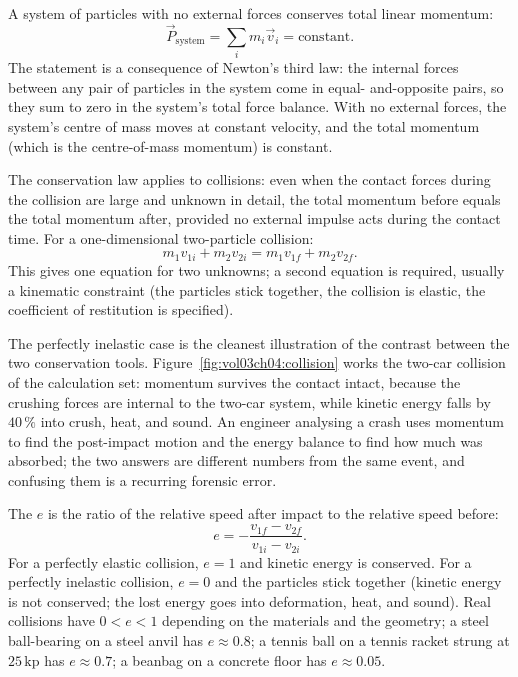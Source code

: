 A system of particles with no external forces conserves total linear
momentum:
\[
\vec{P}_{\text{system}} = \sum_i m_i \vec{v}_i = \text{constant}.
\]
The statement is a consequence of Newton's third law: the internal
forces between any pair of particles in the system come in equal-
and-opposite pairs, so they sum to zero in the system's total force
balance. With no external forces, the system's centre of mass moves
at constant velocity, and the total momentum (which is the
centre-of-mass momentum) is constant.

The conservation law applies to collisions: even when the contact
forces during the collision are large and unknown in detail, the
total momentum before equals the total momentum after, provided no
external impulse acts during the contact time. For a one-dimensional
two-particle collision:
\[
m_1 v_{1i} + m_2 v_{2i} = m_1 v_{1f} + m_2 v_{2f}.
\]
This gives one equation for two unknowns; a second equation is
required, usually a kinematic constraint (the particles stick
together, the collision is elastic, the coefficient of restitution is
specified).



The perfectly inelastic case is the cleanest illustration of the
contrast between the two conservation tools.
Figure~\ref{fig:vol03ch04:collision} works the two-car collision of
the calculation set: momentum survives the contact intact, because the
crushing forces are internal to the two-car system, while kinetic
energy falls by $40\,\%$ into crush, heat, and sound. An engineer
analysing a crash uses momentum to find the post-impact motion and
the energy balance to find how much was absorbed; the two answers are
different numbers from the same event, and confusing them is a
recurring forensic error.

The  $e$ is the ratio of the
relative speed after impact to the relative speed before:
\[
e = -\frac{v_{1f} - v_{2f}}{v_{1i} - v_{2i}}.
\]
For a perfectly elastic collision, $e = 1$ and kinetic energy is
conserved. For a perfectly inelastic collision, $e = 0$ and the
particles stick together (kinetic energy is not conserved; the lost
energy goes into deformation, heat, and sound). Real collisions have
$0 < e < 1$ depending on the materials and the geometry; a steel
ball-bearing on a steel anvil has $e \approx 0.8$; a tennis ball on
a tennis racket strung at $25\,\text{kp}$ has $e \approx 0.7$; a
beanbag on a concrete floor has $e \approx 0.05$.

